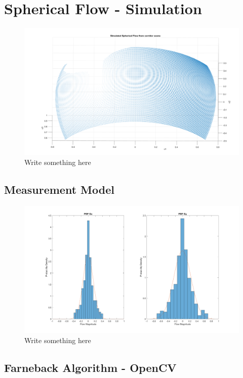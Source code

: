 \documentclass{UoNMCHA}
\numberwithin{equation}{section}
\begin{document}
\newpage
\section{Spherical Flow - Simulation}

\begin{figure}[ht]
    \begin{center}
        \includegraphics[width=1\linewidth]{Figures/SphericalFlowResultsExample}
        \caption{Write something here}
        \label{fig:Unit_Movement}
    \end{center}
\end{figure}

\subsection{Measurement Model}
\begin{figure}[ht]
    \begin{center}
        \includegraphics[width=.6\linewidth]{Figures/Matlab/GoPro_Noise_PDF}
        \caption{Write something here}
        \label{fig:GoPro_Noise_PDF}
    \end{center}
\end{figure}
\subsection{Farneback Algorithm - OpenCV}
\end{document}
